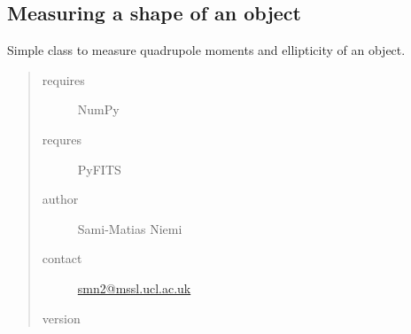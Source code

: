 \documentclass[a4paper,12pt,english]{sphinxmanual}
\begin{document}
\label{analysis:module-analysis.shape}

\subsection{Measuring a shape of an object}
\label{analysis:measuring-a-shape-of-an-object}
Simple class to measure quadrupole moments and ellipticity of an object.
\begin{quote}\begin{description}
\item[{requires}] \leavevmode
NumPy

\item[{requres}] \leavevmode
PyFITS

\item[{author}] \leavevmode
Sami-Matias Niemi

\item[{contact}] \leavevmode
\href{mailto:smn2@mssl.ucl.ac.uk}{smn2@mssl.ucl.ac.uk}

\item[{version}] 

\end{description}\end{quote}
\end{document}
